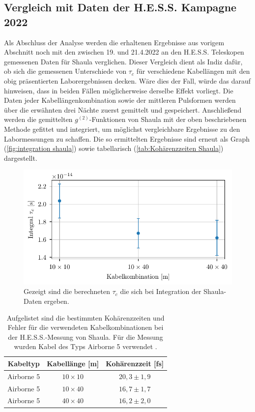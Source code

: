 \subsection{Vergleich mit Daten der H.E.S.S. Kampagne 2022}
\label{ssec:Vergleich mit Hess}
Als Abschluss der Analyse werden die erhaltenen Ergebnisse aus vorigem Abschnitt noch mit den zwischen 19. und 21.4.2022 an den H.E.S.S. Teleskopen gemessenen Daten für Shaula verglichen. 
Dieser Vergleich dient als Indiz dafür, ob sich die gemessenen Unterschiede von $\tau_c$ für verschiedene Kabellängen mit den obig präsentierten Laborergebnissen decken. 
Wäre dies der Fall, würde das darauf hinweisen, dass in beiden Fällen möglicherweise derselbe Effekt vorliegt. 
Die Daten jeder Kabellängenkombination sowie der mittleren Pulsformen werden über die erwähnten drei Nächte zuerst gemittelt und gespeichert. 
Anschließend werden die gemittelten $g^{(2)}$-Funktionen von Shaula mit der oben beschriebenen Methode gefittet und integriert, um möglichst vergleichbare Ergebnisse zu den Labormessungen zu schaffen. 
Die so ermittelten Ergebnisse sind erneut als Graph (\autoref{fig:integration shaula}) sowie tabellarisch (\autoref{tab:Kohärenzzeiten Shaula}) dargestellt. 
\begin{figure}[h]
    \centering
    \includegraphics{images/Analysis/shaula_integrals.pdf}
    \caption{Gezeigt sind die berechneten $\tau_c$ die sich bei Integration der Shaula-Daten ergeben.}
    \label{fig:integration shaula}
\end{figure}
\begin{table}[h]
    \centering
    \begin{tabular}{|c|c|c|} \hline
        Kabeltyp    & Kabellänge [m] & Kohärenzzeit [fs]  \\\hline
        Airborne 5  & $10\times 10$  & $20{,}3 \pm 1{,}9$ \\\hline
        Airborne 5  & $10\times 40$  & $16{,}7 \pm 1{,}7$ \\\hline
        Airborne 5  & $40\times 40$  & $16{,}2 \pm 2{,}0$ \\\hline
    \end{tabular}
    \caption{Aufgelistet sind die bestimmten Kohärenzzeiten und Fehler für die verwendeten Kabelkombinationen bei der H.E.S.S.-Messung von Shaula. Für die Messung wurden Kabel des Typs Airborne 5 verwendet \cite{zmijaFirstIntensityInterferometry2023}.}
    \label{tab:Kohärenzzeiten Shaula}
\end{table}
